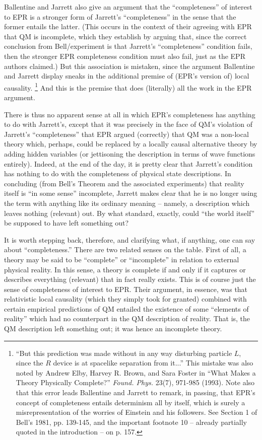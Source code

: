 \documentclass[12pt]{article}
\begin{document}
Ballentine and Jarrett also give an argument that the ``completeness''
of interest to EPR is a stronger form of Jarrett's ``completeness'' in
the sense that the former entails the latter.  (This occurs in the
context of their agreeing with EPR that QM is incomplete, which they
establish by arguing that, since the correct conclusion from
Bell/experiment is that Jarrett's ``completeness'' condition fails,
then the stronger EPR completeness condition must also fail, just as the
EPR authors claimed.)  But this association is mistaken, since
the argument Ballentine and Jarrett display sneaks in the additional
premise of (EPR's version of) local causality.  \footnote{``But this
  prediction was made without in any way disturbing particle $L$,
  since the $R$ device is at spacelike separation from it...''  This
  mistake was also noted by Andrew Elby, Harvey R. Brown, and Sara
  Foster in ``What Makes a Theory Physically Complete?''
  \emph{Found. Phys.} 23(7),  971-985 (1993).  Note
  also that this error leads Ballentine and Jarrett to remark, in
  passing, that EPR's concept of completeness entails determinism all
  by itself, which is surely a misrepresentation of the worries of
  Einstein and his followers.  See Section 1 of Bell's 1981,
  pp. 139-145, and the important footnote 10 -- already partially
  quoted in the introduction -- on p. 157.}
And this is the premise that does (literally) 
all the work in the EPR argument.  

There is thus no apparent sense at all in which EPR's completeness
has anything to do with Jarrett's, except that it was precisely in
the face of QM's violation of Jarrett's ``completeness'' that EPR
argued (correctly) that QM was a non-local theory which, perhaps, could be
replaced by a locally causal alternative theory by adding hidden
variables (or jettisoning the description in terms of wave functions
entirely).  Indeed, at the end of the day, it is pretty clear that 
Jarrett's condition has nothing to do with the completeness of physical
state descriptions.  In concluding (from Bell's Theorem and the
associated experiments) that reality itself is ``in some sense''
incomplete, Jarrett makes clear that he is no longer using the term
with anything like its ordinary meaning -- namely, a description which 
leaves nothing (relevant) out.  By what standard, exactly, could
``the world itself'' be supposed to have left something out?  

It is worth stepping back, therefore, and clarifying what, if 
anything, one can say about ``completeness.''
There are two related senses on the table.  First of all, a theory may
be said to be ``complete'' or ``incomplete'' in relation to external
physical reality.  In this sense, a theory is complete if and only if
it captures or describes everything (relevant) that in fact really
exists.  This is of course just the sense of completeness of interest
to EPR.  Their argument, in essence, was that relativistic local
causality (which they simply took for granted) combined with certain
empirical predictions of QM entailed the existence
of some ``elements of reality'' which had no counterpart in the QM
description of reality.  That is, the QM description left something out;
it was hence
an incomplete theory.  
\end{document}
